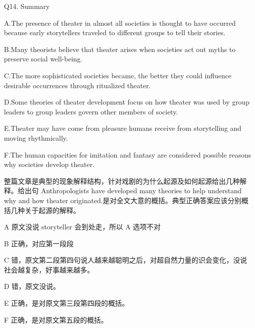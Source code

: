\begin{blk}
    \begin{qst}
        Q14. Summary
    \end{qst}

    \begin{chc}
        A.The presence of theater in almost all societies is thought to have occurred because early storytellers traveled to different groups to tell their stories.

        B.Many theorists believe that theater arises when societies act out myths to preserve social well-being.

        C.The more sophisticated societies became, the better they could influence desirable occurrences through ritualized theater.

        D.Some theories of theater development focus on how theater was used by group leaders to group leaders govern other members of society.

        E.Theater may have come from pleasure humans receive from storytelling and moving rhythmically.

        F.The human capacities for imitation and fantasy are considered possible reasons why societies develop theater.
    \end{chc}

    \begin{nlz}
        整篇文章是典型的现象解释结构，针对戏剧的为什么起源及如何起源给出几种解释。给出句 Anthropologists have developed many theories to help understand why and how theater originated.是对全文大意的概括。典型正确答案应该分别概括几种关于起源的解释。

        A 原文没说 storyteller 会到处走，所以 A 选项不对

        B 正确，对应第一段段

        C 错，原文第二段第四句说人越来越聪明之后，对超自然力量的识会变化，没说社会越复杂，好事越来越多。

        D 错，原文没说。

        E 正确，是对原文第三段第四段的概括。

        F 正确，是对原文第五段的概括。
    \end{nlz}
\end{blk}
